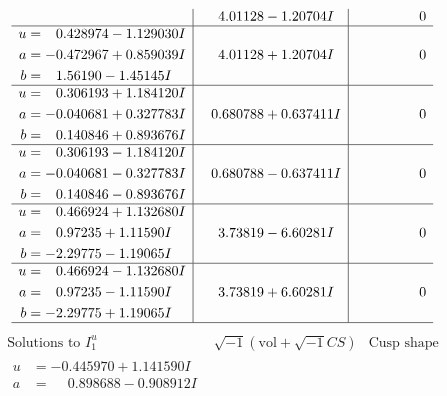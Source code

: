 \documentclass[1p]{elsarticle_modified}
\theoremstyle{definition}
\newcommand{\I}{\sqrt{-1}}
\begin{document}
$$\begin{array}{c|c|c}
 & \phantom{-}4.01128 - 1.20704 I & \phantom{-0.000000 } 0 \\ \hline\begin{aligned}
u &= \phantom{-}0.428974 - 1.129030 I \\
a &= -0.472967 + 0.859039 I \\
b &= \phantom{-}1.56190 - 1.45145 I\end{aligned}
 & \phantom{-}4.01128 + 1.20704 I & \phantom{-0.000000 } 0 \\ \hline\begin{aligned}
u &= \phantom{-}0.306193 + 1.184120 I \\
a &= -0.040681 + 0.327783 I \\
b &= \phantom{-}0.140846 + 0.893676 I\end{aligned}
 & \phantom{-}0.680788 + 0.637411 I & \phantom{-0.000000 } 0 \\ \hline\begin{aligned}
u &= \phantom{-}0.306193 - 1.184120 I \\
a &= -0.040681 - 0.327783 I \\
b &= \phantom{-}0.140846 - 0.893676 I\end{aligned}
 & \phantom{-}0.680788 - 0.637411 I & \phantom{-0.000000 } 0 \\ \hline\begin{aligned}
u &= \phantom{-}0.466924 + 1.132680 I \\
a &= \phantom{-}0.97235 + 1.11590 I \\
b &= -2.29775 - 1.19065 I\end{aligned}
 & \phantom{-}3.73819 - 6.60281 I & \phantom{-0.000000 } 0 \\ \hline\begin{aligned}
u &= \phantom{-}0.466924 - 1.132680 I \\
a &= \phantom{-}0.97235 - 1.11590 I \\
b &= -2.29775 + 1.19065 I\end{aligned}
 & \phantom{-}3.73819 + 6.60281 I & \phantom{-0.000000 } 0\\
 \hline 
 \end{array}$$\newpage$$\begin{array}{c|c|c}  
\text{Solutions to }I^u_{1}& \I (\text{vol} + \sqrt{-1}CS) & \text{Cusp shape}\\
 \hline 
\begin{aligned}
u &= -0.445970 + 1.141590 I \\
a &= \phantom{-}0.898688 - 0.908912 I \\

\end{aligned}
\end{array}$$
\end{document}
